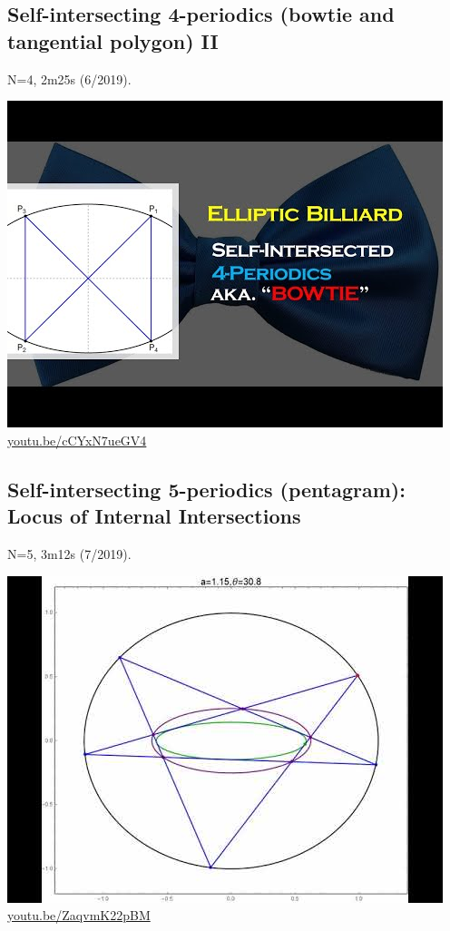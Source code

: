 \documentclass[12pt]{amsart}
\begin{document}
\subsection{Self-intersecting 4-periodics (bowtie and tangential polygon) II}
\label{vid:cCYxN7ueGV4}
\noindent N=4, 2m25s (6/2019). 
\begin{center}\includegraphics[width=.5\textwidth]{pics/cCYxN7ueGV4.jpg} \\ 
\href{https://youtu.be/cCYxN7ueGV4}{\url{youtu.be/cCYxN7ueGV4}}\end{center}
% 

\subsection{Self-intersecting 5-periodics (pentagram): Locus of Internal Intersections}
\label{vid:ZaqvmK22pBM}
\noindent N=5, 3m12s (7/2019). 
\begin{center}\includegraphics[width=.5\textwidth]{pics/ZaqvmK22pBM.jpg} \\ 
\href{https://youtu.be/ZaqvmK22pBM}{\url{youtu.be/ZaqvmK22pBM}}\end{center}
% 
\end{document}

